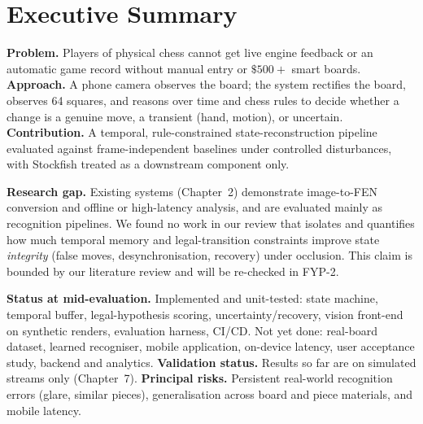 \chapter*{Executive Summary}
\textbf{Problem.} Players of physical chess cannot get live engine feedback or an automatic game record without
manual entry or $\$500+$ smart boards. \textbf{Approach.} A phone camera observes the board; the system rectifies the
board, observes 64 squares, and reasons over time and chess rules to decide whether a change is a genuine move,
a transient (hand, motion), or uncertain. \textbf{Contribution.} A temporal, rule-constrained state-reconstruction
pipeline evaluated against frame-independent baselines under controlled disturbances, with Stockfish treated as a
downstream component only.

\textbf{Research gap.} Existing systems (Chapter~2) demonstrate image-to-FEN conversion and offline or high-latency
analysis, and are evaluated mainly as recognition pipelines. We found no work in our review that isolates and
quantifies how much temporal memory and legal-transition constraints improve state \emph{integrity} (false moves,
desynchronisation, recovery) under occlusion. This claim is bounded by our literature review and will be
re-checked in FYP-2.

\textbf{Status at mid-evaluation.} Implemented and unit-tested: state machine, temporal buffer, legal-hypothesis
scoring, uncertainty/recovery, vision front-end on synthetic renders, evaluation harness, CI/CD. Not yet done:
real-board dataset, learned recogniser, mobile application, on-device latency, user acceptance study, backend and
analytics. \textbf{Validation status.} Results so far are on simulated streams only (Chapter~7).
\textbf{Principal risks.} Persistent real-world recognition errors (glare, similar pieces), generalisation across
board and piece materials, and mobile latency.
